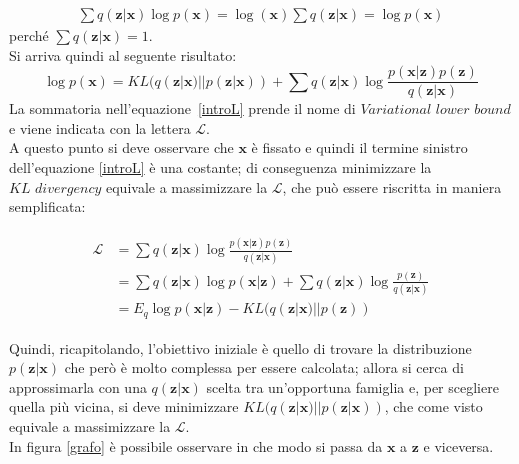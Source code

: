 \begin{align*}
	\sum q(\textbf{z}|\textbf{x})\log p(\textbf{x}) =
	\log (\textbf{x}) \sum q(\textbf{z}|\textbf{x}) =
	\log p(\textbf{x})
\end{align*}
perché $\sum q(\textbf{z}|\textbf{x})=1$. \\
Si arriva quindi al seguente risultato:
\begin{equation}
	\log p(\textbf{x}) = KL (q(\textbf{z}|\textbf{x}) || p(\textbf{z}|\textbf{x})) + \sum q(\textbf{z}|\textbf{x}) \log \frac{p(\textbf{x}|\textbf{z})p(\textbf{z})}{q(\textbf{z}|\textbf{x})}
	\label{introL}
\end{equation}
La sommatoria nell'equazione~\ref{introL} prende il nome di $\textit{Variational lower bound}$ e viene indicata con la lettera $\mathcal{L}$. \\
A questo punto si deve osservare che $\textbf{x}$ è fissato e quindi il termine sinistro dell'equazione \ref{introL} è una costante; di conseguenza minimizzare la $\textit{KL divergency}$ equivale a massimizzare la $\mathcal{L}$, che può essere riscritta in maniera semplificata:

\begin{align*}\label{eq:lower_bound}
\begin{split}
	\mathcal{L} &= \sum q(\textbf{z}|\textbf{x}) \log \frac{p(\textbf{x}|\textbf{z})p(\textbf{z})}{q(\textbf{z}|\textbf{x})} \\
	 &=\sum q(\textbf{z}|\textbf{x}) \log p(\textbf{x}|\textbf{z}) + \sum q(\textbf{z}|\textbf{x}) \log \frac{p(\textbf{z})}{q(\textbf{z}|\textbf{x})} \\
	  &= E_{q}\log p(\textbf{x}|\textbf{z}) - KL (q(\textbf{z}|\textbf{x}) || p(\textbf{z}))
\end{split}
\end{align*}

%


Quindi, ricapitolando, l'obiettivo iniziale è quello di trovare la distribuzione $p(\textbf{z}|\textbf{x})$ che però è molto complessa per essere calcolata; allora si cerca di approssimarla con una $q(\textbf{z}|\textbf{x})$ scelta tra un'opportuna famiglia e, per scegliere quella più vicina, si deve minimizzare $KL (q(\textbf{z}|\textbf{x}) || p(\textbf{z}|\textbf{x}))$, che come visto equivale a massimizzare la $\mathcal{L}$. \\
In figura \ref{grafo} è possibile osservare in che modo si passa da $\textbf{x}$ a $\textbf{z}$ e viceversa.

